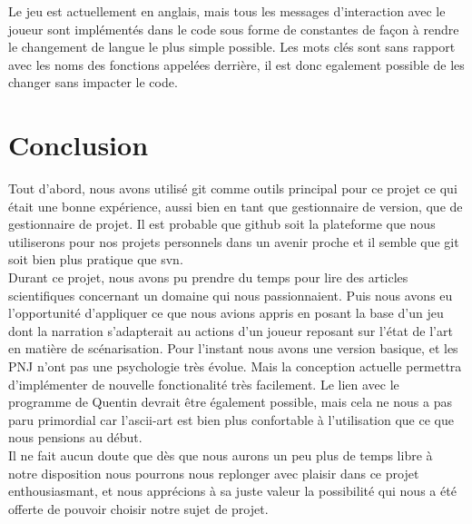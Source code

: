 \documentclass[asi]{picINSA}
\begin{document}
Le jeu est actuellement en anglais, mais tous les messages d'interaction avec le joueur sont implémentés dans le code sous forme de constantes de façon à rendre le changement de langue le plus simple possible. Les mots clés sont sans rapport avec les noms des fonctions appelées derrière, il est donc egalement possible de les changer sans impacter le code.


\chapter{Conclusion}

Tout d'abord, nous avons utilisé git comme outils principal pour ce projet ce qui était une bonne expérience, aussi bien en tant que gestionnaire de version, que de gestionnaire de projet. Il est probable que github soit la plateforme que nous utiliserons pour nos projets personnels dans un avenir proche et il semble que git soit bien plus pratique que svn. \\

Durant ce projet, nous avons pu prendre du temps pour lire des articles scientifiques concernant un domaine qui nous passionnaient. Puis nous avons eu l'opportunité d'appliquer ce que nous avions appris en posant la base d'un jeu dont la narration s'adapterait au actions d'un joueur reposant sur l'état de l'art en matière de scénarisation. Pour l'instant nous avons une version basique, et les PNJ n'ont pas une psychologie très évolue. Mais la conception actuelle permettra d'implémenter de nouvelle fonctionalité très facilement. Le lien avec le programme de Quentin devrait être également possible, mais cela ne nous a pas paru primordial car l'ascii-art est bien plus confortable à l'utilisation que ce que nous pensions au début. \\

Il ne fait aucun doute que dès que nous aurons un peu plus de temps libre à notre disposition nous pourrons nous replonger avec plaisir dans ce projet enthousiasmant, et nous apprécions à sa juste valeur la possibilité qui nous a été offerte de pouvoir choisir notre sujet de projet.
  
\end{document}
